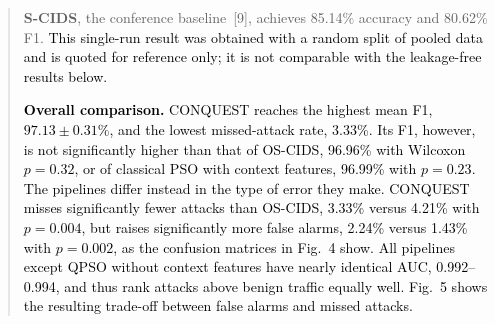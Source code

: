 \documentclass[11pt]{article}
\newenvironment{excerpt}{\begin{quote}\sloppy}{\end{quote}}
\begin{document}
\begin{excerpt}
\begin{table}[H]
\color{black}
\setlength{\tabcolsep}{3pt}
\end{table}

\textbf{S-CIDS}, the conference baseline~{[9]},
achieves 85.14\% accuracy and 80.62\% F1. \textcolor{black}{This single-run result was
obtained with a random split of pooled data and is quoted for
reference only; it is not comparable with the leakage-free results
below.}

\textcolor{black}{\textbf{Overall comparison.}
CONQUEST reaches the highest mean F1, $97.13\pm0.31\%$, and the lowest
missed-attack rate, 3.33\%. Its F1, however, is not significantly
higher than that of OS-CIDS, 96.96\% with Wilcoxon $p=0.32$, or of
classical PSO with context features, 96.99\% with $p=0.23$. The
pipelines differ instead in the type of error they make. CONQUEST
misses significantly fewer attacks than OS-CIDS, 3.33\% versus 4.21\%
with $p=0.004$, but raises significantly more false alarms, 2.24\%
versus 1.43\% with $p=0.002$, as the confusion matrices in
Fig.~4 show. All pipelines except QPSO without
context features have nearly identical AUC, 0.992--0.994, and thus
rank attacks above benign traffic equally well.
Fig.~5 shows the resulting trade-off between
false alarms and missed attacks.}


\end{excerpt}
\end{document}
